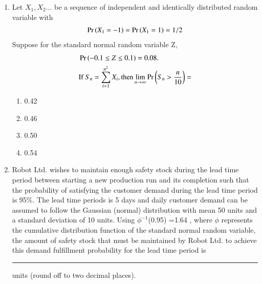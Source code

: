 \begin{enumerate}[label=\thesection.\arabic*.,ref=\thesection.\theenumi]
  \item Let \(X_1,X_2\)... be a sequence of independent and identically distributed random variable with
  \begin{align}
      \Pr\left(X_1=-1\right)=\Pr\left(X_1=1\right)=1/2
  \end{align}
  Suppose for the standard normal random variable Z,
  \begin{align}
  &\pr{-0.1\leq Z \leq 0.1}=0.08 .\label{qneq} \\ \nonumber
  &\text{If } S_n= \sum_{i=1}^{n^2} X_i ,\text{then} \lim_{n\to\infty} \pr{S_n >\frac{n}{10}} =
  \end{align}
  \begin{enumerate}
      \item 0.42
      \item 0.46
      \item 0.50
      \item 0.54
  \end{enumerate}
  \solution
    
%
\item Robot Ltd. wishes to maintain enough safety
stock during the lead time period between
starting a new production run and its completion
such that the probability of satisfying the
customer demand during the lead time period
is 95\%. The lead time periods is 5 days and
daily customer demand can be assumed to follow
the Gaussian (normal) distribution with mean
50 units and a standard deviation of 10 units.
Using $\phi^{-1}$(0.95) =1.64 , where $\phi$ represents the
cumulative distribution function of the standard
normal random variable, the amount of safety
stock that must be maintained by Robot Ltd. to
achieve this demand fulfillment probability for
the lead time period is \rule{1cm}{0.15mm}  units (round off to
two decimal places).
%
\solution
  
  

\end{enumerate}